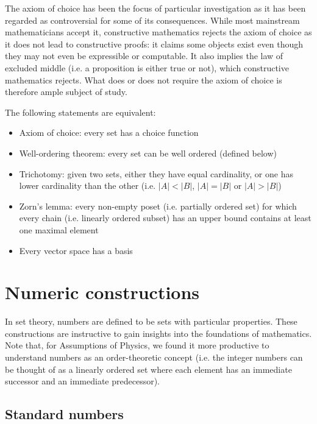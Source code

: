 \documentclass{article}
\begin{document}
The axiom of choice has been the focus of particular investigation as it has been regarded as controversial for some of its consequences. While most mainstream mathematicians accept it, constructive mathematics rejects the axiom of choice as it does not lead to constructive proofs: it claims some objects exist even though they may not even be expressible or computable. It also implies the law of excluded middle (i.e. a proposition is either true or not), which constructive mathematics rejects. What does or does not require the axiom of choice is therefore ample subject of study.

\begin{prop}
	The following statements are equivalent:
	\begin{itemize}
		\item Axiom of choice: every set has a choice function
		\item Well-ordering theorem: every set can be well ordered (defined below)
		\item Trichotomy: given two sets, either they have equal cardinality, or one has lower cardinality than the other (i.e. $|A| < |B|$, $|A| = |B|$ or $|A| > |B|$)
		\item Zorn's lemma: every non-empty poset (i.e. partially ordered set) for which every chain (i.e. linearly ordered subset) has an upper bound contains at least one maximal element
		\item Every vector space has a basis
	\end{itemize}
\end{prop}

\section{Numeric constructions}
In set theory, numbers are defined to be sets with particular properties. These constructions are instructive to gain insights into the foundations of mathematics. Note that, for Assumptions of Physics, we found it more productive to understand numbers as an order-theoretic concept (i.e. the integer numbers can be thought of as a linearly ordered set where each element has an immediate successor and an immediate predecessor).

\subsection{Standard numbers}
\end{document}
